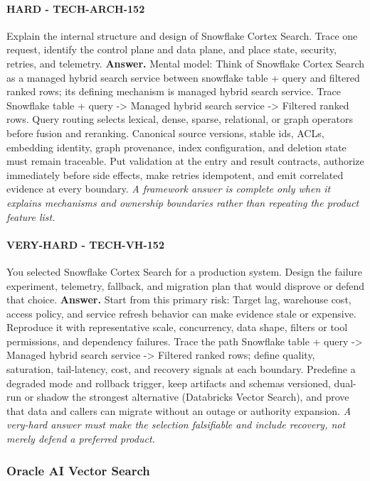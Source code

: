 \paragraph{HARD - TECH-ARCH-152} Explain the internal structure and design of Snowflake Cortex Search. Trace one request, identify the control plane and data plane, and place state, security, retries, and telemetry.
\textbf{Answer.} Mental model: Think of Snowflake Cortex Search as a managed hybrid search service between snowflake table + query and filtered ranked rows; its defining mechanism is managed hybrid search service. Trace Snowflake table + query -> Managed hybrid search service -> Filtered ranked rows. Query routing selects lexical, dense, sparse, relational, or graph operators before fusion and reranking. Canonical source versions, stable ids, ACLs, embedding identity, graph provenance, index configuration, and deletion state must remain traceable. Put validation at the entry and result contracts, authorize immediately before side effects, make retries idempotent, and emit correlated evidence at every boundary.
\textit{A framework answer is complete only when it explains mechanisms and ownership boundaries rather than repeating the product feature list.}
\paragraph{VERY-HARD - TECH-VH-152} You selected Snowflake Cortex Search for a production system. Design the failure experiment, telemetry, fallback, and migration plan that would disprove or defend that choice.
\textbf{Answer.} Start from this primary risk: Target lag, warehouse cost, access policy, and service refresh behavior can make evidence stale or expensive. Reproduce it with representative scale, concurrency, data shape, filters or tool permissions, and dependency failures. Trace the path Snowflake table + query -> Managed hybrid search service -> Filtered ranked rows; define quality, saturation, tail-latency, cost, and recovery signals at each boundary. Predefine a degraded mode and rollback trigger, keep artifacts and schemas versioned, dual-run or shadow the strongest alternative (Databricks Vector Search), and prove that data and callers can migrate without an outage or authority expansion.
\textit{A very-hard answer must make the selection falsifiable and include recovery, not merely defend a preferred product.}
\subsubsection*{Oracle AI Vector Search}
